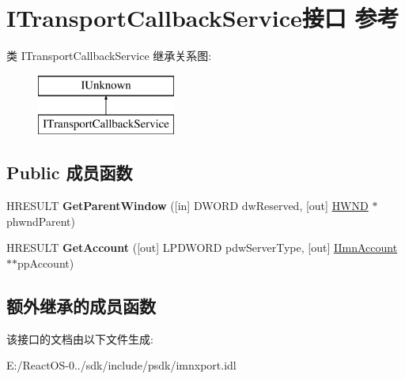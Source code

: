 \hypertarget{interface_i_transport_callback_service}{}\section{I\+Transport\+Callback\+Service接口 参考}
\label{interface_i_transport_callback_service}
类 I\+Transport\+Callback\+Service 继承关系图\+:\begin{figure}[H]
\begin{center}
\leavevmode
\includegraphics[height=2.000000cm]{interface_i_transport_callback_service}
\end{center}
\end{figure}
\subsection*{Public 成员函数}
\begin{DoxyCompactItemize}
\item 
\mbox{\label{interface_i_transport_callback_service_a573112929d718efb933d0e003c42343a}} 
H\+R\+E\+S\+U\+LT {\bfseries Get\+Parent\+Window} (\mbox{[}in\mbox{]} D\+W\+O\+RD dw\+Reserved, \mbox{[}out\mbox{]} \hyperlink{interfacevoid}{H\+W\+ND} $\ast$phwnd\+Parent)
\item 
\mbox{\label{interface_i_transport_callback_service_aa3a7f83703a5fa39e232e40b4625759f}} 
H\+R\+E\+S\+U\+LT {\bfseries Get\+Account} (\mbox{[}out\mbox{]} L\+P\+D\+W\+O\+RD pdw\+Server\+Type, \mbox{[}out\mbox{]} \hyperlink{interface_i_imn_account}{I\+Imn\+Account} $\ast$$\ast$pp\+Account)
\end{DoxyCompactItemize}
\subsection*{额外继承的成员函数}


该接口的文档由以下文件生成\+:\begin{DoxyCompactItemize}
\item 
E\+:/\+React\+O\+S-\/0../sdk/include/psdk/imnxport.\+idl\end{DoxyCompactItemize}
